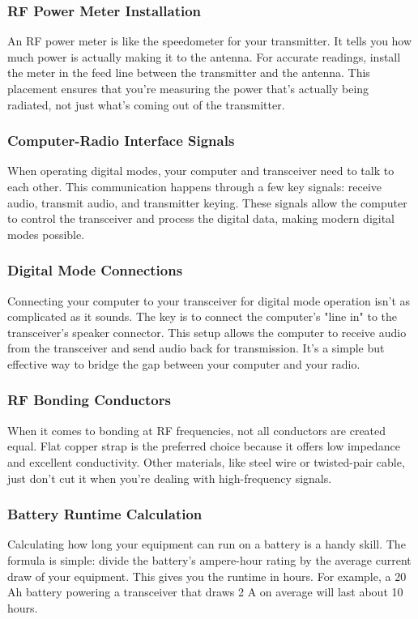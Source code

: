 \subsubsection*{RF Power Meter Installation}
An RF power meter is like the speedometer for your transmitter. It tells you how much power is actually making it to the antenna. For accurate readings, install the meter in the feed line between the transmitter and the antenna. This placement ensures that you're measuring the power that's actually being radiated, not just what's coming out of the transmitter.

\subsubsection*{Computer-Radio Interface Signals}
When operating digital modes, your computer and transceiver need to talk to each other. This communication happens through a few key signals: receive audio, transmit audio, and transmitter keying. These signals allow the computer to control the transceiver and process the digital data, making modern digital modes possible.

\subsubsection*{Digital Mode Connections}
Connecting your computer to your transceiver for digital mode operation isn't as complicated as it sounds. The key is to connect the computer's "line in" to the transceiver's speaker connector. This setup allows the computer to receive audio from the transceiver and send audio back for transmission. It's a simple but effective way to bridge the gap between your computer and your radio.

\subsubsection*{RF Bonding Conductors}
When it comes to bonding at RF frequencies, not all conductors are created equal. Flat copper strap is the preferred choice because it offers low impedance and excellent conductivity. Other materials, like steel wire or twisted-pair cable, just don't cut it when you're dealing with high-frequency signals.

\subsubsection*{Battery Runtime Calculation}
Calculating how long your equipment can run on a battery is a handy skill. The formula is simple: divide the battery's ampere-hour rating by the average current draw of your equipment. This gives you the runtime in hours. For example, a 20 Ah battery powering a transceiver that draws 2 A on average will last about 10 hours.

